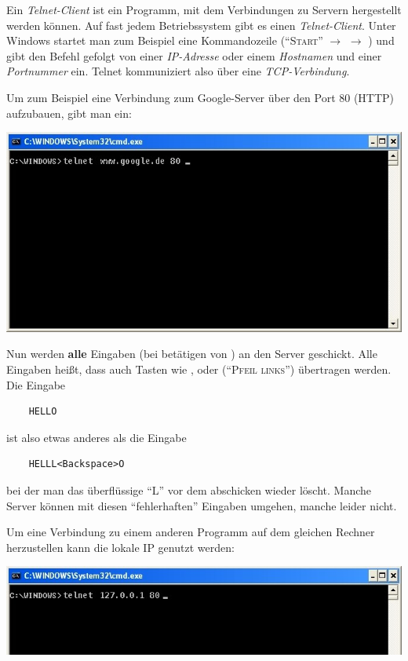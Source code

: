 \documentclass[10pt, a4paper]{arbeitsblatt}
\begin{document}
\ReiheTitel

Ein \emph{Telnet-Client} ist ein Programm, mit dem Verbindungen zu Servern hergestellt werden können. Auf fast jedem Betriebssystem gibt es einen \emph{Telnet-Client}. Unter Windows startet man zum Beispiel eine Kommandozeile (\enquote{\textsc{Start}} $\rightarrow$  $\rightarrow$ ) und gibt den Befehl  gefolgt von einer \emph{IP-Adresse} oder einem \emph{Hostnamen} und einer \emph{Portnummer} ein. Telnet kommuniziert also über eine \emph{TCP-Verbindung}.

Um zum Beispiel eine Verbindung zum Google-Server über den Port 80 (HTTP) aufzubauen, gibt man ein:

\begin{center}
	\includegraphics[width=.8\textwidth]{Q2-GK-AB.II.5-Abb_cmd.png}
\end{center}

Nun werden \textbf{alle} Eingaben (bei betätigen von ) an den Server geschickt. Alle Eingaben heißt, dass auch Tasten wie , oder \keys{$\leftarrow$} (\enquote{\textsc{Pfeil links}}) übertragen werden. Die Eingabe

\begin{verbatim}
	HELLO
\end{verbatim}

ist also etwas anderes als die Eingabe

\begin{verbatim}
	HELLL<Backspace>O
\end{verbatim}

bei der man das überflüssige \enquote{L} vor dem abschicken wieder löscht. Manche Server können mit diesen \enquote{fehlerhaften} Eingaben umgehen, manche leider nicht.

Um eine Verbindung zu einem anderen Programm auf dem gleichen Rechner herzustellen kann die lokale IP  genutzt werden:

\begin{center}
	\includegraphics[width=.8\textwidth]{Q2-GK-AB.II.5-Abb_home.png}
\end{center}
\end{document}
